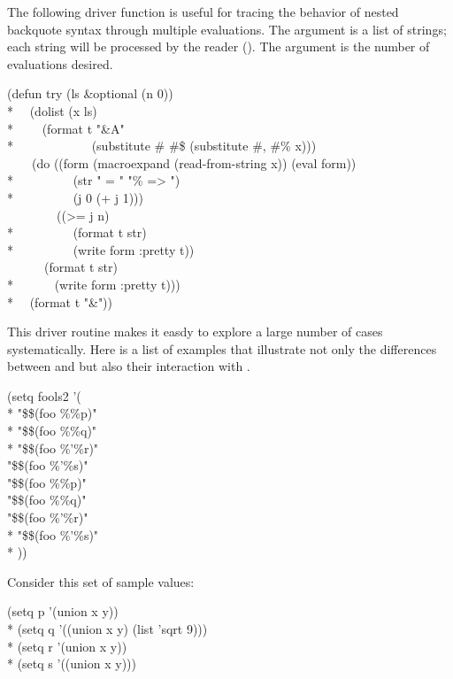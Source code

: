 \begin{new}
The following driver function is useful for tracing the behavior
of nested backquote syntax through multiple evaluations.
The argument  is a list of strings; each string
will be processed by the reader ().
The argument  is the number of evaluations desired.
\begin{lisp}
(defun try (ls \&optional (n 0)) \\*
~~(dolist (x ls) \\*
~~~~(format t "{\Xtilde}\&{\Xtilde}A" \\*
~~~~~~~~~~~~(substitute \#{\Xbackslash}{\Xbq} \#{\Xbackslash}\$ (substitute \#{\Xbackslash}, \#{\Xbackslash}\% x))) \\
~~~~(do ((form (macroexpand (read-from-string x)) (eval form)) \\*
~~~~~~~~~(str " = " "{\Xtilde}\% => ") \\*
~~~~~~~~~(j 0 (+ j 1))) \\
~~~~~~~~((>= j n) \\*
~~~~~~~~~(format t str) \\*
~~~~~~~~~(write form :pretty t)) \\
~~~~~~(format t str) \\*
~~~~~~(write form :pretty t))) \\*
~~(format t "{\Xtilde}\&"))
\end{lisp}
This driver routine makes it easdy to explore a large number of cases
systematically.  Here is a list of examples that illustrate not only
the differences between \cd{,} and \cd{,{\Xatsign}} but also their
interaction with .
\begin{lisp}
(setq fools2 '( \\*
"\$\$(foo \%\%p)" \\*
"\$\$(foo \%\%{\Xatsign}q)" \\*
"\$\$(foo \%'\%r)" \\
"\$\$(foo \%'\%{\Xatsign}s)" \\
"\$\$(foo \%{\Xatsign}\%p)" \\
"\$\$(foo \%{\Xatsign}\%{\Xatsign}q)" \\
"\$\$(foo \%{\Xatsign}'\%r)" \\*
"\$\$(foo \%{\Xatsign}'\%{\Xatsign}s)" \\*
))
\end{lisp}

Consider this set of sample values:
\begin{lisp}
(setq p '(union x y)) \\*
(setq q '((union x y) (list 'sqrt 9))) \\*
(setq r '(union x y)) \\*
(setq s '((union x y)))
\end{lisp}


\end{new}
